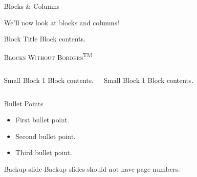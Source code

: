 \documentclass[noamssymb,noamsmath,aspectratio=169,9pt]{beamer}
\begin{document}
\begin{frame}{Blocks \& Columns}

  We'll now look at blocks and columns!
  \pause

  \begin{block}{Block Title}
    Block contents.
  \end{block}

  \pause
  \begin{block}{}
    \begin{center}
      \textsc{Blocks Without Borders}\textsuperscript{TM}
    \end{center}
  \end{block}

  \pause
  \begin{columns}
    \begin{block}{Small Block 1}
      Block contents.
    \end{block}

    \begin{block}{Small Block 1}
      Block contents.
    \end{block}
  \end{columns}
\end{frame}

\begin{frame}{Bullet Points}

\begin{itemize}
  \item First bullet point.
    \pause
  \item Second bullet point.
    \pause
  \item Third bullet point.
\end{itemize}
\end{frame}

\begin{frame}{Backup slide}
  Backup slides should not have page numbers.
\end{frame}
\end{document}
